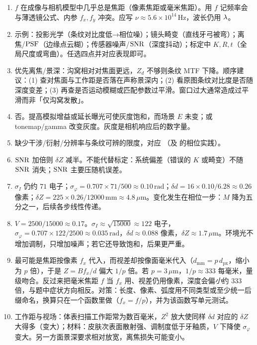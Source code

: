 \begin{enumerate}
  \item $f$ 在成像与相机模型中几乎总是焦距（像素焦距或毫米焦距）。用 $f$ 记频率会与薄透镜公式、内参 $f_x,f_y$ 冲突。应写 $\nu\approx5.6\times10^{14}\,\mathrm{Hz}$，波长仍用 $\lambda$。
  \item 示例：投影光学（条纹对比度低→相位噪）；镜头畸变（直线牙弓被弯）；离焦/$\mathrm{PSF}$（边缘点云糊）；传感器噪声/$\mathrm{SNR}$（深度抖动）；标定中 $K,R,t$（全局尺度或弯曲）。任选四点并对应表现即可。
  \item 优先离焦/景深：沟窝相对对焦面更远，$Z_d$ 不够则条纹 MTF 下降。顺序建议：(1) 查对焦面与工作距是否落在声称景深内；(2) 看原图条纹对比度是否随深度变差；(3) 再查是否运动模糊或匹配参数过平滑。窗口过大通常造成过平滑而非「仅沟窝发散」。
  \item 否。提高模拟增益或延长曝光可使灰度饱和，而场景 $E$ 未变；或 tonemap/gamma 改变灰度。灰度是相机响应后的数字量。
  \item 缺少干涉/衍射/分辨率与条纹可辨的限度，对应 （及  的相位实践）。
  \item $\mathrm{SNR}$ 加倍则 $\delta Z$ 减半。不能代替标定：系统偏差（错误的 $K$ 或畸变）不随 $\mathrm{SNR}$ 消失；$\mathrm{SNR}$ 主要压随机误差。
  \item $\sigma_I$ 仍约 $71$ 电子；$\sigma_\varphi=0.707\times71/500\approx0.10\,\mathrm{rad}$；$\delta d=16\times0.10/6.28\approx0.26$ 像素；$\delta Z=225\times0.26/12000\,\mathrm{mm}\approx4.8\,\mu\mathrm{m}$。变化发生在相位一步：$M$ 降为五分之一，后续各步线性传递。
  \item $V=2500/15000\approx0.17$。$\sigma_I\approx\sqrt{15000}\approx122$ 电子，$\sigma_\varphi=0.707\times122/2500\approx0.035\,\mathrm{rad}$，$\delta d\approx0.088$ 像素，$\delta Z\approx1.7\,\mu\mathrm{m}$。环境光不增加调制，只增加噪声；若它还导致饱和，后果更严重。
  \item 最可能是焦距按像素 $f_x$ 代入，而视差却按像面毫米代入（$d_{\mathrm{mm}}=p\,d_{\mathrm{px}}$，缩小为 $p$ 倍），于是 $Z=Bf_x/d$ 偏大 $1/p$ 倍。若 $p=3\,\mu\mathrm{m}$，$1/p\approx333$ 每毫米，量级吻合。反过来把毫米焦距 $f$ 当 $f_x$ 用、视差仍用像素，深度会偏\emph{小}约 $333$ 倍，与题中症状方向相反。对策：长度、像素、弧度用不同类型或至少统一后缀命名，换算只在一个函数里做（$f_x=f/p$），并为该函数写单元测试。
  \item 工作距与视场：体表扫描工作距常为数百毫米，$Z^2$ 放大使同样 $\delta d$ 对应的 $\delta Z$ 大得多（变大）；材料：皮肤次表面散射强、调制度低于牙釉质，$V$ 下降使 $\sigma_\varphi$ 变大。另一方面景深要求相对放宽，离焦损失可能变小。
\end{enumerate}
